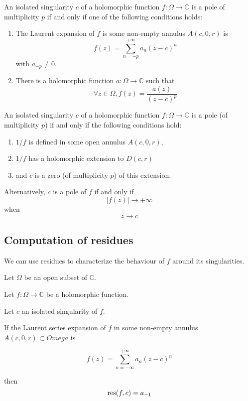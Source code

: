 \begin{thm*}

    An isolated singularity $c$ of a holomorphic function $f: \Omega \rightarrow \mathbb{C}$ is a pole of multiplicity $p$ if and only if one of the following conditions holds:
    \begin{enumerate}
        \item The Laurent expansion of $f$ is some non-empty annulus $A(c, 0, r)$ is 
            $$ f(z) = \sum_{n=-p}^{+\infty} a_n(z-c)^n$$
            with $ a_{-p} \neq 0$.
        \item There is a holomorphic function $a: \Omega \rightarrow \mathbb{C}$ such that 
            $$\forall z \in \Omega, f(z) = \frac{a(z)}{(z-c)^p} $$
    \end{enumerate}
\end{thm*}

\begin{thm*}

    An isolated singularity $c$ of a holomorphic function $f: \Omega \rightarrow \mathbb{C}$ is a pole (of multiplicity $p$) if and only if the following conditions hold:
    \begin{enumerate}
        \item $ 1/f $ is defined in some open annulus $A(c, 0, r)$,
        \item $ 1/f$ has a holomorphic extension to $D(c, r)$
        \item and $c$ is a zero (of multiplicity $p$) of this extension.
    \end{enumerate}

    Alternatively, $c$ is a pole of $f$ if and only if
    $$ |f(z)| \rightarrow + \infty$$ when $$ z \rightarrow c $$
\end{thm*}


\subsection{Computation of residues}

We can use residues to characterize the behaviour of $f$ around its singularities.

\begin{thm*}
    Let $\Omega$ be an open subset of $\mathbb{C}$.

    Let $f: \Omega \rightarrow \mathbb{C}$ be a holomorphic function.

    Let $c$ an isolated singularity of $f$.

    If the Laurent series expansion of $f$ in some non-empty annulus $A(c, 0, r)\subset Omega$ is 

    $$ f(z) = \sum_{n=-\infty}^{+\infty} a_n(z-c)^n $$

    then $$ \operatorname{res}(f, c) = a_{-1} $$
    
\end{thm*}

